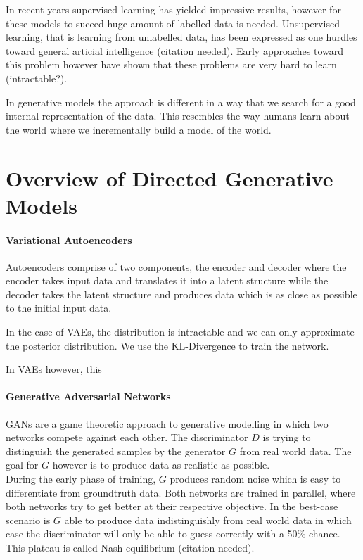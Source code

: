 \documentclass[twoside,11pt,a4paper]{article}
\theoremstyle{break}
\begin{document}
In recent years supervised learning has yielded impressive results,
however for these models to suceed huge amount of labelled data is needed.
Unsupervised learning, that is learning from unlabelled data, has been expressed
as one hurdles toward general articial intelligence (citation needed).
Early approaches toward this problem however have shown that these problems are very hard to learn (intractable?).

In generative models the approach is different in a way that
we search for a good internal representation of the data.
This resembles the way humans learn about the world where we incrementally build
a model of the world.


\section{Overview of Directed Generative Models}
\label{sec:overview}


\paragraph{Variational Autoencoders\cite{vae:2013}}
\label{par:overview_vae}
Autoencoders comprise of two components, the encoder and decoder
where the encoder takes input data and translates it into a latent structure while
the decoder takes the latent structure and produces data which is as close as possible to the initial input data.

In the case of VAEs, the distribution is intractable and we can only approximate the posterior distribution.
We use the KL-Divergence to train the network.

In VAEs however, this 




\paragraph{Generative Adversarial Networks}
\label{par:overview_gan}
GANs are a game theoretic approach to generative modelling
in which two networks compete against each other.
The discriminator $D$ is trying to distinguish the generated samples
by the generator $G$ from real world data.
The goal for $G$ however is to produce data as realistic as possible.\\
During the early phase of training, $G$ produces random noise which
is easy to differentiate from groundtruth data.
Both networks are trained in parallel, where both networks try to get better
at their respective objective.
In the best-case scenario is $G$ able to produce data indistinguishly from real world data in which
case the discriminator will only be able to guess correctly with a 50\% chance.
This plateau is called Nash equilibrium (citation needed).
\end{document}
